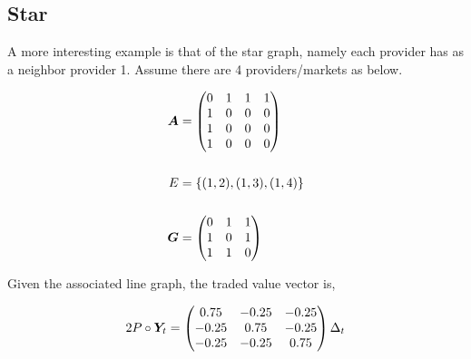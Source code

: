 
\subsection{Star}

A more interesting example is that of the star graph, namely each provider has as a neighbor provider 1. Assume there are 4 providers/markets as below.

\vspace{5mm}
\begin{minipage}{.5\textwidth}
    \resizebox{\textwidth}{!}{}
\end{minipage}
\begin{minipage}{.5\textwidth}
    \begin{equation*}
        \begin{split}
            \matr{A} &= \begin{pmatrix}
                0 & 1 & 1 & 1 \\
                1 & 0 & 0 & 0 \\
                1 & 0 & 0 & 0 \\
                1 & 0 & 0 & 0
            \end{pmatrix} \\
            \vspace{5mm} \\
            E &= \set{(1, 2), (1, 3), (1, 4)} \\
            \vspace{5mm} \\
            \matr{G} &= \begin{pmatrix}
                0 & 1 & 1 \\
                1 & 0 & 1 \\
                1 & 1 & 0
            \end{pmatrix}
        \end{split}
    \end{equation*}
\end{minipage}
\vspace{5mm}

Given the associated line graph, the traded value vector is,

\begin{equation}
    2 P \circ \bm{Y}_t = \begin{pmatrix}
        0.75  & -0.25 & -0.25 \\
        -0.25 & 0.75  & -0.25 \\
        -0.25 & -0.25 & 0.75
    \end{pmatrix} \Delta_t
\end{equation}

